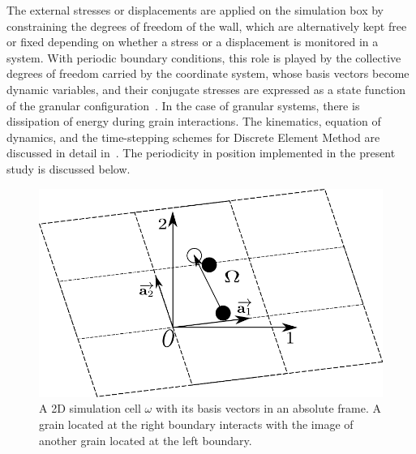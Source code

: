 The external stresses or displacements are applied on the simulation box by 
constraining the degrees of freedom of the wall, which are alternatively kept 
free or fixed depending on whether a stress or a displacement is monitored in a 
system. With periodic boundary conditions, this role is played by the 
collective degrees of freedom carried by the coordinate system, whose basis 
vectors become dynamic variables, and their conjugate stresses are expressed as 
a state function of the granular configuration~\citep{Parrinello1980}. In the 
case of granular systems, there is dissipation of energy during grain 
interactions. The kinematics, equation of dynamics, and the time-stepping 
schemes for Discrete Element Method are discussed in detail 
in~\citet{Voiv2011}. The periodicity in position implemented in the present 
study is discussed below. 
%
\begin{figure}[htbp]
\centering
\includegraphics[scale=0.65]{periodic}
\caption[A 2D simulation cell $\omega$ with its basis vectors in an absolute 
frame]{A 2D simulation cell $\omega$ with its basis vectors in an absolute 
frame. A grain located at the right boundary interacts with the image of 
another grain located at the left boundary.}
\label{fig:periodic}
\end{figure}

